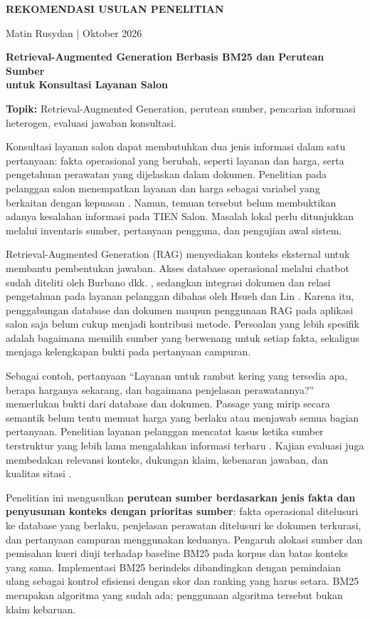 \documentclass[11pt,a4paper]{article}
\newcommand{\heading}[1]{\vspace{5pt}{\large\bfseries #1}\par\vspace{1pt}}
\begin{document}
\begin{center}
{\Large\bfseries REKOMENDASI USULAN PENELITIAN}\par
\vspace{4pt}
{\normalsize Matin Rusydan \quad |  Oktober 2026}
\end{center}

\heading{Rencana Judul}
\textbf{Retrieval-Augmented Generation Berbasis BM25 dan Perutean Sumber\\untuk Konsultasi Layanan Salon}

\textbf{Topik:} Retrieval-Augmented Generation, perutean sumber, pencarian informasi heterogen, evaluasi jawaban konsultasi.

\heading{Masalah Utama}
Konsultasi layanan salon dapat membutuhkan dua jenis informasi dalam satu pertanyaan: fakta operasional yang berubah, seperti layanan dan harga, serta pengetahuan perawatan yang dijelaskan dalam dokumen. Penelitian pada pelanggan salon menempatkan layanan dan harga sebagai variabel yang berkaitan dengan kepuasan \cite{rachmawati}. Namun, temuan tersebut belum membuktikan adanya kesalahan informasi pada TIEN Salon. Masalah lokal perlu ditunjukkan melalui inventaris sumber, pertanyaan pengguna, dan pengujian awal sistem.

Retrieval-Augmented Generation (RAG) menyediakan konteks eksternal untuk membantu pembentukan jawaban. Akses database operasional melalui chatbot sudah diteliti oleh Burbano dkk. \cite{burbano}, sedangkan integrasi dokumen dan relasi pengetahuan pada layanan pelanggan dibahas oleh Hsueh dan Lin \cite{hsueh}. Karena itu, penggabungan database dan dokumen maupun penggunaan RAG pada aplikasi salon saja belum cukup menjadi kontribusi metode. Persoalan yang lebih spesifik adalah bagaimana memilih sumber yang berwenang untuk setiap fakta, sekaligus menjaga kelengkapan bukti pada pertanyaan campuran.

Sebagai contoh, pertanyaan ``Layanan untuk rambut kering yang tersedia apa, berapa harganya sekarang, dan bagaimana penjelasan perawatannya?'' memerlukan bukti dari database dan dokumen. Passage yang mirip secara semantik belum tentu memuat harga yang berlaku atau menjawab semua bagian pertanyaan. Penelitian layanan pelanggan mencatat kasus ketika sumber terstruktur yang lebih lama mengalahkan informasi terbaru \cite{hsueh}. Kajian evaluasi juga membedakan relevansi konteks, dukungan klaim, kebenaran jawaban, dan kualitas sitasi \cite{knollmeyer,gao}.

Penelitian ini mengusulkan \textbf{perutean sumber berdasarkan jenis fakta dan penyusunan konteks dengan prioritas sumber}: fakta operasional ditelusuri ke database yang berlaku, penjelasan perawatan ditelusuri ke dokumen terkurasi, dan pertanyaan campuran menggunakan keduanya. Pengaruh alokasi sumber dan pemisahan kueri diuji terhadap baseline BM25 pada korpus dan batas konteks yang sama. Implementasi BM25 berindeks dibandingkan dengan pemindaian ulang sebagai kontrol efisiensi dengan skor dan ranking yang harus setara. BM25 merupakan algoritma yang sudah ada; penggunaan algoritma tersebut bukan klaim kebaruan.
\end{document}
